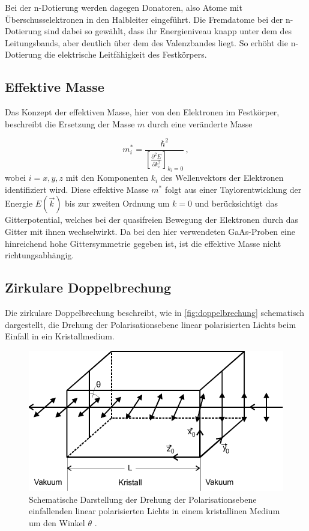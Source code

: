 Bei der n-Dotierung werden dagegen Donatoren, also Atome mit Überschusselektronen in den Halbleiter eingeführt.
Die Fremdatome bei der n-Dotierung sind dabei so gewählt, dass ihr Energieniveau knapp unter dem des Leitungsbands,
aber deutlich über dem des Valenzbandes liegt.
So erhöht die n-Dotierung die elektrische Leitfähigkeit des Festkörpers.


\subsection{Effektive Masse}

Das Konzept der effektiven Masse, hier von den Elektronen im Festkörper, beschreibt die Ersetzung der Masse $m$ durch eine veränderte Masse

\begin{equation}
    m^*_i = \frac{\hbar^2}{\left[\frac{\partial^2 E}{\partial k^2_i} \right]_{k_i=0}} \,,
    \label{eq:effektivemasse}
\end{equation}
wobei $i = x,y,z$ mit den Komponenten $k_i$ des Wellenvektors der Elektronen identifiziert wird.
Diese effektive Masse $m^*$ folgt aus einer Taylorentwicklung der Energie $E(\vec{k})$ bis zur zweiten Ordnung um $k=0$ und berücksichtigt das Gitterpotential,
welches bei der quasifreien Bewegung der Elektronen durch das Gitter mit ihnen wechselwirkt.
Da bei den hier verwendeten GaAs-Proben eine hinreichend hohe Gittersymmetrie gegeben ist, ist die effektive Masse nicht richtungsabhängig.


\subsection{Zirkulare Doppelbrechung}

Die zirkulare Doppelbrechung beschreibt, wie in \autoref{fig:doppelbrechung} schematisch dargestellt,
die Drehung der Polarisationsebene linear polarisierten Lichts beim Einfall in ein Kristallmedium.

\begin{figure}[H]
    \centering
    \includegraphics[width=.6\textwidth]{figures/doppelbrechung.pdf}
    \caption{Schematische Darstellung der Drehung der Polarisationsebene einfallenden linear polarisierten Lichts in einem kristallinen Medium um den Winkel $\theta$ \cite{doppbre}.}
    \label{fig:doppelbrechung}
\end{figure}

